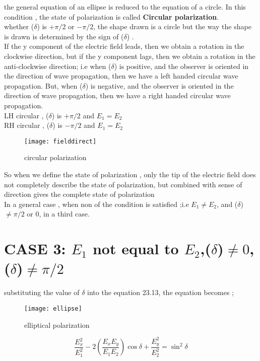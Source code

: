 the general equation of an ellipse is reduced to the equation of a circle. In this condition , the state of polarization is called \textbf{Circular polarization}. \\
whether  ($\delta$) is $+\pi/2$  or  $-\pi/2 $, the shape drawn is a circle but the way the shape is drawn is determined by the sign of ($\delta$) .\\
  If the y component of the electric field leads, then we obtain a rotation in the clockwise direction, but if the y component lags, then we obtain a rotation in the anti-clockwise direction; i.e when ($\delta$) is positive, and the observer is oriented in the direction of wave propagation, then we have a left handed circular wave propagation. But, when ($\delta$) is negative, and the observer is oriented in the direction of wave propagation, then we have a right handed circular wave propagation.\\
  LH circular , ($\delta$) is $ +\pi/2$ and $ E_1 = E_2$\\
  RH circular , ($\delta$) is $-\pi/2$ and $ E_1 = E_2$ \\
\begin{figure}
	\centering
	\texttt{[image: fielddirect]}
	\caption{circular polarization}
\end{figure}  
  So when we define the state of polarization , only the tip of the electric field does not completely describe the state of polarization, but combined with sense of direction gives the complete state of polarization \\
  In a general case , when non of the condition is satisfied ;i.e $ E_1 \neq E_2$, and ($\delta$)$ \neq \pi/2$ or $ 0 $, in a third case.
   
  \section{CASE 3: $ E_1 $ not equal to $ E_2 $,($\delta$)$\neq 0$,\\ ($\delta$)$\neq \pi/2 $}
  substituting the value of $\delta$ into the equation 23.13, the equation becomes ;
\begin{figure}
	\centering
	\texttt{[image: ellipse]}
	\caption{elliptical polarization}
\end{figure}

 \begin{equation}
\frac{E_{x}^2}{E_{1}^2} -2(\frac{E_{x}E_{y}}{E_{1}E_{2}})\cos\delta + \frac{E_{y}^2}{E_{2}^2} =\sin^2 \delta
\end{equation}

